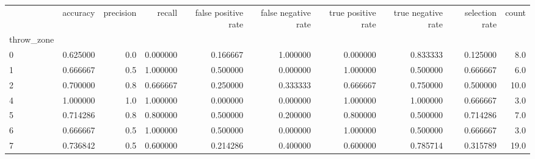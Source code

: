 \begin{tabular}{lrrrrrrrrr}
\toprule
{} &  accuracy &  precision &    recall &  false positive rate &  false negative rate &  true positive rate &  true negative rate &  selection rate &  count \\
throw\_zone &           &            &           &                      &                      &                     &                     &                 &        \\
\midrule
0          &  0.625000 &        0.0 &  0.000000 &             0.166667 &             1.000000 &            0.000000 &            0.833333 &        0.125000 &    8.0 \\
1          &  0.666667 &        0.5 &  1.000000 &             0.500000 &             0.000000 &            1.000000 &            0.500000 &        0.666667 &    6.0 \\
2          &  0.700000 &        0.8 &  0.666667 &             0.250000 &             0.333333 &            0.666667 &            0.750000 &        0.500000 &   10.0 \\
4          &  1.000000 &        1.0 &  1.000000 &             0.000000 &             0.000000 &            1.000000 &            1.000000 &        0.666667 &    3.0 \\
5          &  0.714286 &        0.8 &  0.800000 &             0.500000 &             0.200000 &            0.800000 &            0.500000 &        0.714286 &    7.0 \\
6          &  0.666667 &        0.5 &  1.000000 &             0.500000 &             0.000000 &            1.000000 &            0.500000 &        0.666667 &    3.0 \\
7          &  0.736842 &        0.5 &  0.600000 &             0.214286 &             0.400000 &            0.600000 &            0.785714 &        0.315789 &   19.0 \\
\bottomrule
\end{tabular}

